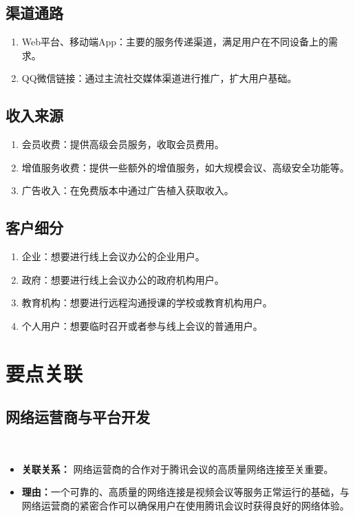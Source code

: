 \documentclass[a4paper,12pt]{article}
\begin{document}
    \subsection{渠道通路}
    \begin{enumerate}
        \item Web平台、移动端App：主要的服务传递渠道，满足用户在不同设备上的需求。
        \item QQ微信链接：通过主流社交媒体渠道进行推广，扩大用户基础。
    \end{enumerate}

    \subsection{收入来源}
    \begin{enumerate}
        \item 会员收费：提供高级会员服务，收取会员费用。
        \item 增值服务收费：提供一些额外的增值服务，如大规模会议、高级安全功能等。
        \item 广告收入：在免费版本中通过广告植入获取收入。
    \end{enumerate}

    \subsection{客户细分}
    \begin{enumerate}
        \item 企业：想要进行线上会议办公的企业用户。
        \item 政府：想要进行线上会议办公的政府机构用户。
        \item 教育机构：想要进行远程沟通授课的学校或教育机构用户。
        \item 个人用户：想要临时召开或者参与线上会议的普通用户。
    \end{enumerate}


    \section{要点关联}
    \subsection{网络运营商与平台开发}\
    \begin{itemize}
        \item \textbf{关联关系：} 网络运营商的合作对于腾讯会议的高质量网络连接至关重要。
        \item \textbf{理由：}一个可靠的、高质量的网络连接是视频会议等服务正常运行的基础，与网络运营商的紧密合作可以确保用户在使用腾讯会议时获得良好的网络体验。
    \end{itemize}
\end{document}
